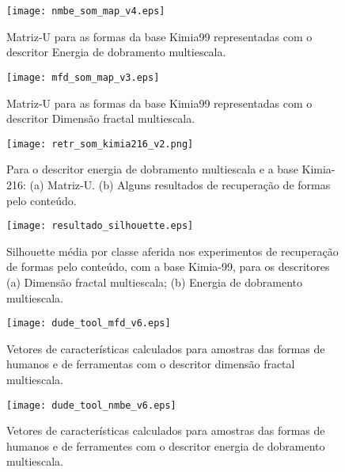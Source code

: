 \begin{figure}[h!]
  \caption{\label{fig:nmbe_som_map} Matriz-U para as formas da base Kimia99 representadas com o descritor Energia de dobramento multiescala.}
  \centering
  \texttt{[image: nmbe\_som\_map\_v4.eps]}
\end{figure}

\begin{figure}[h!]
  \caption{\label{fig:mfd_som_map} Matriz-U para as formas da base Kimia99 representadas com o descritor Dimensão fractal multiescala.}
  \centering
  \texttt{[image: mfd\_som\_map\_v3.eps]}
\end{figure}
  
\begin{figure}[h!]  \caption{\label{fig:som_kimia_216} Para o descritor energia de dobramento multiescala e a base Kimia-216: (a) Matriz-U. (b) Alguns resultados de recuperação de formas pelo conteúdo.}
  \centering
  \texttt{[image: retr\_som\_kimia216\_v2.png]}
\end{figure}

\begin{figure}[h!]
  \caption{\label{fig:silhouette} Silhouette média por classe aferida nos experimentos de recuperação de formas pelo conteúdo, com a base Kimia-99, para os descritores (a) Dimensão fractal multiescala; (b) Energia de dobramento multiescala.}
  \centering
  \texttt{[image: resultado\_silhouette.eps]}
\end{figure}

\begin{figure}[h!]
  \caption{\label{fig:dude_tool_mfd}   Vetores de características calculados para amostras das formas de humanos e de ferramentas com o descritor dimensão fractal multiescala.}
  \centering
  \texttt{[image: dude\_tool\_mfd\_v6.eps]}
\end{figure}

\begin{figure}[h!]
  \caption{\label{fig:dude_tool_nmbe} Vetores de características calculados para amostras das formas de humanos e de ferramentes com o descritor energia de dobramento multiescala.}
  \centering
  \texttt{[image: dude\_tool\_nmbe\_v6.eps]}
\end{figure}


\begin{comment}
\begin{figure}[h!]
  \caption{\label{fig:som_nmbe} Visualização dos dados obtida com o mapa auto-organizável de Kohonen para a descrição \emph{NMBE}.}
  \centering
  \texttt{[image: mapa\_som\_descritor\_nmbe.png]}
\end{figure}

\begin{figure}[h!]
  \caption{\label{fig:som_dfm} Visualização dos dados obtida com o mapa auto-organizável de Kohonen para a descrição \emph{NMBE}.}
  \centering
  \texttt{[image: mapa\_som\_descritor\_dfm.png]}
\end{figure}
\end{comment}


